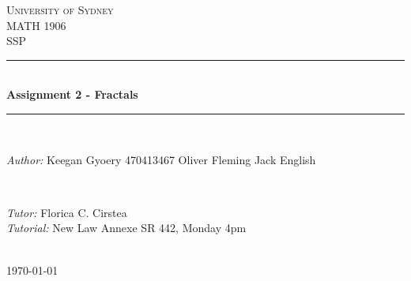 \documentclass[a4paper]{article}
\begin{document}
\begin{titlepage}

\newcommand{\HRule}{\rule{\linewidth}{0.5mm}} %

\center %
 
\textsc{\LARGE University of Sydney}\\[1.5cm] %
\textsc{\Large MATH 1906}\\[0.5cm] %
\textsc{\large SSP}\\[0.5cm] %

\HRule \\[0.4cm]
{ \huge \bfseries Assignment 2 - Fractals}\\[0.4cm] %
\HRule \\[1.5cm]

\begin{minipage}{0.4\textwidth}
\begin{flushleft} \large
\emph{Author:}
Keegan Gyoery 
470413467
Oliver Fleming
Jack English
\\


\end{flushleft}
\end{minipage}
~
\begin{minipage}{0.4\textwidth}
\begin{flushright} \large
\emph{Tutor:} 
Florica C. Cirstea %
\\
\emph{Tutorial:}
New Law Annexe SR 442, Monday 4pm
\end{flushright}
\end{minipage}\\[4cm]

{\large \today}\\[3cm] %

\vfill %

\end{titlepage}

\end{document}

